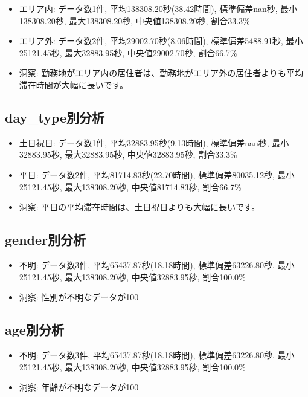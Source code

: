 \documentclass[11pt,a4paper]{article}
\begin{document}
\begin{itemize}
    \item エリア内: データ数1件, 平均138308.20秒(38.42時間), 標準偏差nan秒, 最小138308.20秒, 最大138308.20秒, 中央値138308.20秒, 割合33.3\%
    \item エリア外: データ数2件, 平均29002.70秒(8.06時間), 標準偏差5488.91秒, 最小25121.45秒, 最大32883.95秒, 中央値29002.70秒, 割合66.7\%
    \item 洞察: 勤務地がエリア内の居住者は、勤務地がエリア外の居住者よりも平均滞在時間が大幅に長いです。
\end{itemize}

\subsection{day\_type別分析}

\begin{itemize}
    \item 土日祝日: データ数1件, 平均32883.95秒(9.13時間), 標準偏差nan秒, 最小32883.95秒, 最大32883.95秒, 中央値32883.95秒, 割合33.3\%
    \item 平日: データ数2件, 平均81714.83秒(22.70時間), 標準偏差80035.12秒, 最小25121.45秒, 最大138308.20秒, 中央値81714.83秒, 割合66.7\%
    \item 洞察: 平日の平均滞在時間は、土日祝日よりも大幅に長いです。
\end{itemize}

\subsection{gender別分析}

\begin{itemize}
    \item 不明: データ数3件, 平均65437.87秒(18.18時間), 標準偏差63226.80秒, 最小25121.45秒, 最大138308.20秒, 中央値32883.95秒, 割合100.0\%
    \item 洞察: 性別が不明なデータが100%
\end{itemize}

\subsection{age別分析}

\begin{itemize}
    \item 不明: データ数3件, 平均65437.87秒(18.18時間), 標準偏差63226.80秒, 最小25121.45秒, 最大138308.20秒, 中央値32883.95秒, 割合100.0\%
    \item 洞察: 年齢が不明なデータが100%
\end{itemize}
\end{document}
